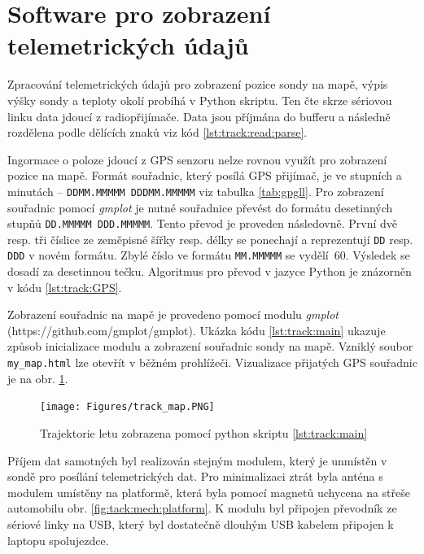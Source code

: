 \documentclass[twoside]{ctuthesis}
\theoremstyle{plain}
\theoremstyle{definition}
\theoremstyle{note}
\begin{document}
	\section{Software pro zobrazení telemetrických údajů}
	Zpracování telemetrických údajů pro zobrazení pozice sondy na mapě, výpis výšky sondy a teploty okolí probíhá v Python skriptu. Ten čte skrze sériovou linku data jdoucí z radiopřijímače. Data jsou příjmána do bufferu a následně rozdělena podle dělících znaků viz kód \ref{lst:track:read:parse}.
	

	Ingormace o poloze jdoucí z GPS senzoru nelze rovnou využít pro zobrazení pozice na mapě. Formát souřadnic, který posílá GPS přijímač, je ve stupních a minutách -- \lstinline|DDMM.MMMMM DDDMM.MMMMM| viz tabulka \ref{tab:gpgll}. Pro zobrazení souřadnic pomocí \textit{gmplot} je nutné souřadnice převést do formátu desetinných stupňů \lstinline|DD.MMMMM DDD.MMMMM|. Tento převod je proveden následovně. První dvě resp. tři číslice ze zeměpisné šířky resp. délky se ponechají a reprezentují \lstinline|DD| resp. \lstinline|DDD| v novém formátu. Zbylé číslo ve formátu \lstinline|MM.MMMMM| se vydělí~60. Výsledek se dosadí za desetinnou tečku. Algoritmus pro převod v jazyce Python je znázorněn v kódu \ref{lst:track:GPS}.

	

	Zobrazení souřadnic na mapě je provedeno pomocí modulu \textit{gmplot} (https://github.com/gmplot/gmplot). Ukázka kódu \ref{lst:track:main} ukazuje způsob inicializace modulu a zobrazení souřadnic sondy na mapě. Vzniklý soubor \lstinline|my_map.html| lze otevřít v běžném prohlížeči. Vizualizace přijatých GPS souřadnic je na obr. \ref{fig:track:map}.

	

	\begin{figure}
		\centering
		\texttt{[image: Figures/track\_map.PNG]}
		\caption{Trajektorie letu zobrazena pomocí python skriptu \ref{lst:track:main}}
		\label{fig:track:map}
	\end{figure}

	Příjem dat samotných byl realizován stejným modulem, který je unmístěn v sondě pro posílání telemetrických dat. Pro minimalizaci ztrát byla anténa s modulem umístěny na platformě, která byla pomocí magnetů uchycena na střeše automobilu obr. \ref{fig:tack:mech:platform}. K modulu byl připojen převodník ze sériové linky na USB, který byl dostatečně dlouhým USB kabelem připojen k laptopu spolujezdce.
\end{document}
